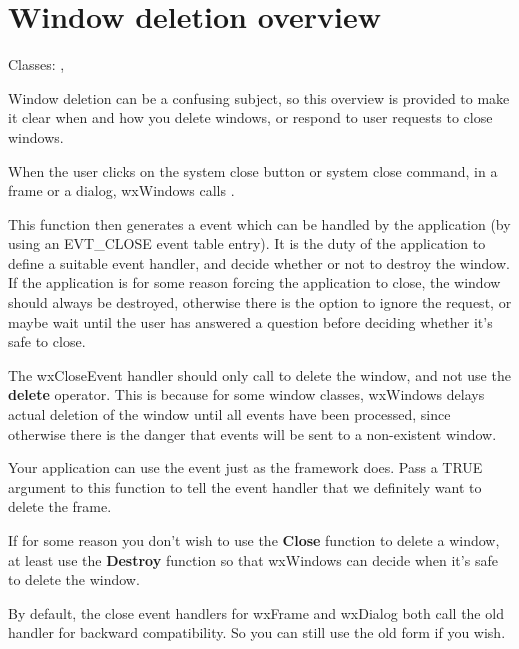 \section{Window deletion overview}\label{windowdeletionoverview}

Classes: , 

Window deletion can be a confusing subject, so this overview is provided
to make it clear when and how you delete windows, or respond to user requests
to close windows.


When the user clicks on the system close button or system close command,
in a frame or a dialog, wxWindows calls .

This function then generates a  event which
can be handled by the application (by using an EVT\_CLOSE event table entry). It is the duty of the application to
define a suitable event handler, and decide whether or not to destroy the window.
If the application is for some reason forcing the application to close,
the window should always be destroyed, otherwise there is the option to
ignore the request, or maybe wait until the user has answered a question
before deciding whether it's safe to close.

The wxCloseEvent handler should only call  to
delete the window, and not use the {\bf delete} operator. This is because
for some window classes, wxWindows delays actual deletion of the window until all events have been processed,
since otherwise there is the danger that events will be sent to a non-existent window.


Your application can use the  event just as
the framework does. Pass a TRUE argument to this function to tell the event handler
that we definitely want to delete the frame.

If for some reason you don't wish to use the {\bf Close} function to delete a window, at least use
the {\bf Destroy} function so that wxWindows can decide when it's safe to delete the window.


By default, the close event handlers for wxFrame and wxDialog
both call the old  handler
for backward compatibility. So you can still use the old form if you wish.

